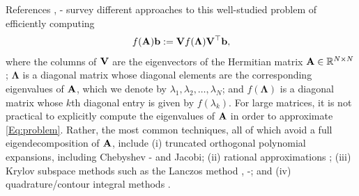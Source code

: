 \documentclass{article}
\begin{document}
References \cite[Chapter 13]{higham}, \cite{davies2005computing}\nocite{frommer}-\cite{moler2003nineteen} survey different approaches to this well-studied problem of efficiently computing 
\begin{align}\label{Eq:problem}
f({\bf A}){\bf b}:={\bf V}f({\boldsymbol \Lambda}){\bf V}^{\top}{\bf b},
\end{align}
where the columns of ${\bf V}$ are the eigenvectors of the Hermitian matrix ${\bf A}\in \mathbb{R}^{N \times N}$; ${\boldsymbol \Lambda}$ is a diagonal matrix whose diagonal elements are the corresponding eigenvalues of ${\bf A}$, which we denote by $\lambda_1, \lambda_2, \ldots, \lambda_N$; and $f({\boldsymbol \Lambda})$ is a diagonal matrix whose $k$th diagonal entry is given by $f(\lambda_k)$. For large matrices, it is not practical to explicitly compute the eigenvalues of ${\bf A}$ in order to approximate \eqref{Eq:problem}. Rather, the most common %
techniques, all of which avoid a full eigendecomposition of ${\bf A}$, include (i) truncated orthogonal polynomial expansions, including Chebyshev \cite{druskin}\nocite{saad2006filtered}-\cite{chen_saad} and Jacobi;
(ii) rational approximations \cite[Section 3.4]{frommer}; (iii) Krylov subspace methods such as the Lanczos method \cite{druskin}, \cite{druskin1998extended}\nocite{eiermann2006restarted,afanasjew2008implementation}-\cite{frommer2017radau}; and (iv) quadrature/contour integral methods \cite[Section 13.3]{higham}. 
\end{document}
